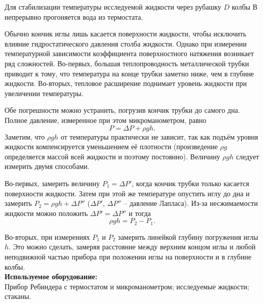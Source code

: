 \documentclass[a4paper, 12pt]{article}%
\begin{document}
	Для стабилизации температуры исследуемой жидкости через рубашку $ D $ колбы $ В $ непрерывно прогоняется вода из термостата.
	
	Обычно кончик иглы лишь касается поверхности жидкости, чтобы исключить влияние гидростатического давления столба жидкости. Однако при измерении температурной зависимости коэффициента поверхностного натяжения возникает ряд сложностей. Во-первых, большая теплопроводность металлической трубки приводит к тому, что температура на конце трубки заметно ниже, чем в глубине жидкости. Во-вторых, тепловое расширение поднимает уровень жидкости при увеличении температуры.
	
	Обе погрешности можно устранить, погрузив кончик трубки до самого дна. Полное давление, измеренное при этом микроманометром, равно \[ P = \Delta P + \rho g h.\] Заметим, что $ \rho gh $ от температуры практически не зависит, так как подъём уровня жидкости компенсируется уменьшением её плотности (произведение $ \rho g $ определяется массой всей жидкости и поэтому постоянно). Величину  $ \rho g h $ следует измерить двумя способами.
	
	Во-первых, замерить величину $ P_1= \Delta P' $, когда кончик трубки только касается поверхности жидкости. Затем при этой же температуре опустить иглу до дна и замерить $ P_2= \rho gh + \Delta P'' $ ($ \Delta P' $, $ \Delta P'' $ -- давление Лапласа). Из-за  несжимаемости  жидкости можно положить $ \Delta P' = \Delta P'' $ и тогда \[ \rho gh= P_2 - P_1. \]
	
	Во-вторых, при измерениях $ P_1 $ и $ P_2 $ замерить линейкой  глубину погружения иглы $ h $. Это можно сделать, замеряя расстояние между верхним концом иглы и любой неподвижной частью прибора при положении иглы на поверхности и в глубине колбы.\\
	
	
	\textbf{Используемое оборудование: }\\
	
	Прибор Ребиндера с термостатом и микроманометром;
	исследуемые жидкости; стаканы.\\
	
	\newpage
	
\end{document}
